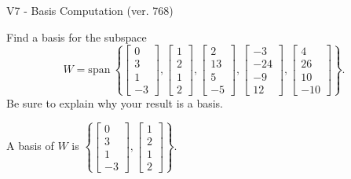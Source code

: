 \begin{exercise}
  \begin{exerciseTitle}V7 - Basis Computation (ver. 768)\end{exerciseTitle}
  \begin{exerciseStatement}
    Find a basis for the subspace 
\[W=\mathrm{span}\ \left\{\left[\begin{array}{r}
0 \\
3 \\
1 \\
-3
\end{array}\right] , \left[\begin{array}{r}
1 \\
2 \\
1 \\
2
\end{array}\right] , \left[\begin{array}{r}
2 \\
13 \\
5 \\
-5
\end{array}\right] , \left[\begin{array}{r}
-3 \\
-24 \\
-9 \\
12
\end{array}\right] , \left[\begin{array}{r}
4 \\
26 \\
10 \\
-10
\end{array}\right]\right\}.\]
 Be sure to explain why your result is a basis.


  \end{exerciseStatement}
  \begin{exerciseAnswer}
   A basis of \(W\) is  \(\left\{\left[\begin{array}{r}
0 \\
3 \\
1 \\
-3
\end{array}\right] , \left[\begin{array}{r}
1 \\
2 \\
1 \\
2
\end{array}\right]\right\}\).
  


  \end{exerciseAnswer}
\end{exercise}